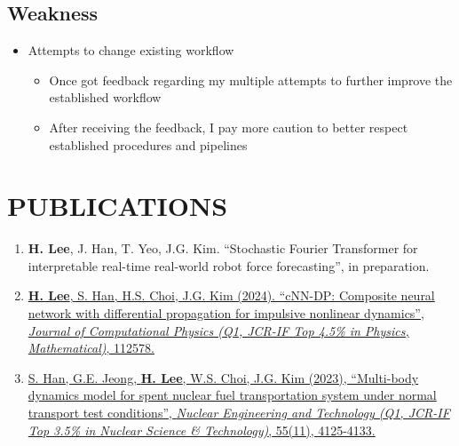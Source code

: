\documentclass[a4paper,10pt]{extarticle}
\begin{document}
\subsection*{Weakness}
\begin{itemize}
	\item Attempts to change existing workflow
	      \begin{itemize}
		      \item Once got feedback regarding my multiple attempts to further improve the established workflow
		      \item After receiving the feedback, I pay more caution to better respect established procedures and pipelines
	      \end{itemize}
\end{itemize}

\section*{PUBLICATIONS}
\noindent
\begin{enumerate}[leftmargin=.5cm]
	\item \textbf{H. Lee}, J. Han, T. Yeo, J.G. Kim. “Stochastic Fourier Transformer for interpretable real-time real-world robot force forecasting”, in preparation.
	\item \href{https://www.sciencedirect.com/science/article/pii/S0021999123006733?casa_token=ARUkhI8XI8YAAAAA:wTzCIauJvSlonWw-J-SlAFqPX6NZRQS-qBX59l4YN5O3caEppoglU0duVmMkZYf4nWYd7tm_D_E}{\textbf{H. Lee}, S. Han, H.S. Choi, J.G. Kim (2024). “cNN-DP: Composite neural network with differential propagation for impulsive nonlinear dynamics”, \textit{Journal of Computational Physics (Q1, JCR-IF Top 4.5\% in Physics, Mathematical)}, 112578.}
	\item \href{https://www.google.com/url?sa=t&rct=j&q=&esrc=s&source=web&cd=&cad=rja&uact=8&ved=2ahUKEwij36zWpNKCAxXMMEQIHSBfBMUQFnoECBEQAQ&url=https%3A%2F%2Fwww.sciencedirect.com%2Fscience%2Farticle%2Fpii%2FS1738573323003492&usg=AOvVaw1zj_G3k5c77uhMNnmu0EEC&opi=89978449}{S. Han, G.E. Jeong, \textbf{H. Lee}, W.S. Choi, J.G. Kim (2023), “Multi-body dynamics model for spent nuclear fuel transportation system under normal transport test conditions”, \textit{Nuclear Engineering and Technology (Q1, JCR-IF Top 3.5\% in Nuclear Science \& Technology)}, 55(11), 4125-4133.}
\end{enumerate}

\end{document}
